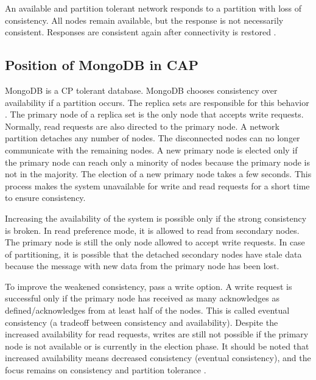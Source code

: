 An available and partition tolerant network responds to a partition with loss of consistency. All nodes remain available, but the response is not necessarily consistent. Responses are consistent again after connectivity is restored \parencite[6]{brewer:2002}.

\subsection*{Position of MongoDB in CAP}

MongoDB is a \ac{CP} tolerant database. MongoDB chooses consistency over availability if a partition occurs. The replica sets are responsible for this behavior \parencite{stackoverflow:2023}.
The primary node of a replica set is the only node that accepts write requests. Normally, read requests are also directed to the primary node. A network partition detaches any number of nodes. The disconnected nodes can no longer communicate with the remaining nodes. A new primary node is elected only if the primary node can reach only a minority of nodes because the primary node is not in the majority. The election of a new primary node takes a few seconds. This process makes the system unavailable for write and read requests for a short time to ensure consistency.

Increasing the availability of the system is possible only if the strong consistency is broken. In read preference mode, it is allowed to read from secondary nodes. The primary node is still the only node allowed to accept write requests. In case of partitioning, it is possible that the detached secondary nodes have stale data because the message with new data from the primary node has been lost.

To improve the weakened consistency, pass a write option. A write request is successful only if the primary node has received as many acknowledges as defined/acknowledges from at least half of the nodes. This is called eventual consistency (a tradeoff between consistency and availability). Despite the increased availability for read requests, writes are still not possible if the primary node is not available or is currently in the election phase. It should be noted that increased availability means decreased consistency (eventual consistency), and the focus remains on consistency and partition tolerance \parencite{katwal:2020}.